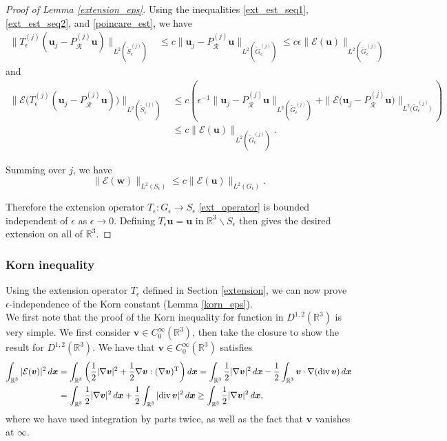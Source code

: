 \documentclass[11pt]{article}
\numberwithin{equation}{section}
\newcommand{\R}{\mathbb{R}}
\newcommand{\E}{\mathcal{E}}
\newcommand{\sR}{\mathcal{R}}
\newcommand{\bu}{\bm{u}}
\newcommand{\bw}{\bm{w}}
\newcommand{\bx}{\bm{x}}
\newcommand{\bv}{\bm{v}}
\newcommand{\ts}{\thinspace}
\newcommand{\dive}{{\rm{div}}}
\theoremstyle{definition}
\begin{document}
\begin{proof}[Proof of Lemma \ref{extension_eps}]
Using the inequalities \eqref{ext_est_seq1}, \eqref{ext_est_seq2}, and \eqref{poincare_est}, we have
\begin{align*}
\|T_{\epsilon}^{(j)}(\bu_j -P_{\sR}^{(j)}\bu)\|_{L^2(\tilde S_{\epsilon}^{(j)})} &\le c \|\bu_j -P_{\sR}^{(j)}\bu\|_{L^2(\tilde G_{\epsilon}^{(j)})} \le c\epsilon\|\E(\bu)\|_{L^2(\tilde G_{\epsilon}^{(j)})}
\end{align*}
and
\begin{align*}
\|\E\big(T_{\epsilon}^{(j)}(\bu_j-P_{\sR}^{(j)}\bu)\big)\|_{L^2(\tilde S_{\epsilon}^{(j)})} &\le c\left(\epsilon^{-1}\|\bu_j-P_{\sR}^{(j)}\bu\|_{L^2(\tilde G_{\epsilon}^{(j)})}+\|\E\big(\bu_j -P_{\sR}^{(j)}\bu)\|_{L^2(\tilde G_{\epsilon}^{(j)}\big)} \right) \\
&\le c\| \E(\bu) \|_{L^2(\tilde G_{\epsilon}^{(j)})} .
\end{align*}

Summing over $j$, we have
\[ \|\E(\bw)\|_{L^2(S_{\epsilon})} \le c\| \E(\bu) \|_{L^2(G_{\epsilon})}. \]

Therefore the extension operator $T_{\epsilon}: G_{\epsilon}\to S_{\epsilon}$ \eqref{ext_operator} is bounded independent of $\epsilon$ as $\epsilon\to 0$. Defining $T_{\epsilon}\bu=\bu$ in $\R^3\backslash S_{\epsilon}$ then gives the desired extension on all of $\R^3$. 
\end{proof}

\subsubsection{Korn inequality}\label{korn_proof}
Using the extension operator $T_\epsilon$ defined in Section \ref{extension}, we can now prove $\epsilon$-independence of the Korn constant (Lemma \ref{korn_eps}). \\

We first note that the proof of the Korn inequality for function in $D^{1,2}(\R^3)$ is very simple. We first consider $\bv\in C_0^{\infty}(\R^3)$, then take the closure to show the result for $D^{1,2}(\R^3)$. We have that $\bv\in C_0^{\infty}(\R^3)$ satisfies 
\begin{align*}
\int_{\R^3} |\mathcal{E}(\bv)|^2 \ts d\bx &= \int_{\R^3}\bigg( \frac{1}{2}|\nabla \bv|^2 + \frac{1}{2}\nabla\bv:(\nabla\bv)^{\rm T}\bigg) \ts d\bx = \int_{\R^3} \frac{1}{2}|\nabla \bv|^2 \ts d\bx - \frac{1}{2}\int_{\R^3} \bv \cdot \nabla( \dive \ts\bv) \ts d\bx \\
&= \int_{\R^3} \frac{1}{2}|\nabla \bv|^2 \ts d\bx + \frac{1}{2}\int_{\R^3} |\dive \ts \bv|^2 \ts d\bx \ge \int_{\R^3} \frac{1}{2}|\nabla \bv|^2 \ts d\bx,
\end{align*}
where we have used integration by parts twice, as well as the fact that $\bv$ vanishes at $\infty$. \\
\end{document}

